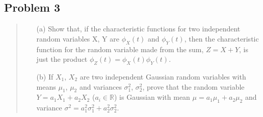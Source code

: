 \documentclass[10pt]{article}
\begin{document}
\subsection*{Problem 3}
\begin{quote}
	\begin{enumerate}
		\item[(a)] Show that, if the characteristic functions for two independent random variables X, Y are $\phi_{X}(t)$ and $\phi_{Y}(t)$, then the characteristic function for the random variable made from the sum, $Z=X+Y$, is just the product $\phi_{Z}(t)=\phi_{X}(t)\phi_{Y}(t)$.
		\item[(b)] If $X_{1}$, $X_{2}$ are two independent Gaussian random variables with means $\mu_{1}$, $\mu_{2}$ and variances $\sigma_{1}^{2}$, $\sigma_{2}^{2}$, prove that the random variable $Y=a_{1}X_{1}+a_{2}X_{2}$ ($a_{i}\in\mathbb{R}$) is Gaussian with mean $\mu=a_{1}\mu_{1}+a_{2}\mu_{2}$ and variance $\sigma^{2}=a_{1}^{2}\sigma_{1}^{2}+a_{2}^{2}\sigma_{2}^{2}$.
	\end{enumerate}
\end{quote}

\divider
\end{document}
